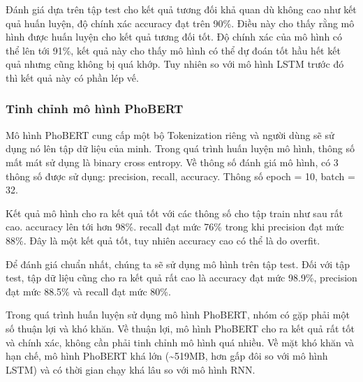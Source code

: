 Đánh giá dựa trên tập test cho kết quả tương đối khả quan dù không cao như kết quả huấn luyện, độ chính xác accuracy đạt trên 90\%. Điều này cho thấy rằng mô hình được huấn luyện cho kết quả tương đối tốt. Độ chính xác của mô hình có thể lên tới 91\%, kết quả này cho thấy mô hình có thể dự đoán tốt hầu hết kết quả nhưng cũng không bị quá khớp. Tuy nhiên so với mô hình LSTM trước đó thì kết quả này có phần lép vế.

\subsubsection{Tinh chỉnh mô hình PhoBERT}
Mô hình PhoBERT cung cấp một bộ Tokenization riêng và người dùng sẽ sử dụng nó lên tập dữ liệu của minh. Trong quá trình huấn luyện mô hình, thông số mất mát sử dụng là binary cross entropy. Về thông số đánh giá mô hình, có 3 thông số được sử dụng: precision, recall, accuracy. Thông số epoch = 10, batch = 32.

Kết quả mô hình cho ra kết quả tốt với các thông số cho tập train như sau rất cao. accuracy lên tới hơn 98\%. recall đạt mức 76\% trong khi precision đạt mức 88\%. Đây là một kết quả tốt, tuy nhiên accuracy cao có thể là do overfit.

Để đánh giá chuẩn nhất, chúng ta sẽ sử dụng mô hình trên tập test. Đối với tập test, tập dữ liệu cũng cho ra kết quả rất cao là accuracy đạt mức 98.9\%, precision đạt mức 88.5\% và recall đạt mức 80\%.

Trong quá trình huấn luyện sử dụng mô hình PhoBERT, nhóm có gặp phải một số thuận lợi và khó khăn. Về thuận lợi, mô hình PhoBERT cho ra kết quả rất tốt và chính xác, không cần phải tinh chỉnh mô hình quá nhiều. Về mặt khó khăn và hạn chế, mô hình PhoBERT khá lớn (\textasciitilde 519MB, hơn gấp đôi so với mô hình LSTM) và có thời gian chạy khá lâu so với mô hình RNN.

